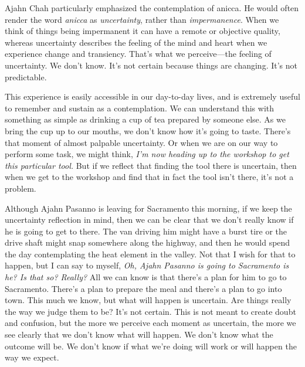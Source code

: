 Ajahn Chah particularly emphasized the contemplation of anicca. He 
would often render the word \emph{anicca} as \emph{uncertainty}, rather 
than \emph{impermanence}. When we think of things being impermanent it 
can have a remote or objective quality, whereas uncertainty describes 
the feeling of the mind and heart when we experience change and 
transiency. That's what we perceive---the feeling of uncertainty. We 
don't know. It's not certain because things are changing. It's not 
predictable.

This experience is easily accessible in our day-to-day lives, and is 
extremely useful to remember and sustain as a contemplation. We can 
understand this with something as simple as drinking a cup of tea 
prepared by someone else. As we bring the cup up to our mouths, we 
don't know how it's going to taste. There's that moment of almost 
palpable uncertainty. Or when we are on our way to perform some task, 
we might think, \emph{I'm now heading up to the workshop to get this 
particular tool.} But if we reflect that finding the tool there is 
uncertain, then when we get to the workshop and find that in fact the 
tool isn't there, it's not a problem.

Although Ajahn Pasanno is leaving for Sacramento this morning, if we 
keep the uncertainty reflection in mind, then we can be clear that we 
don't really know if he is going to get to there. The van driving him 
might have a burst tire or the drive shaft might snap somewhere along 
the highway, and then he would spend the day contemplating the heat 
element in the valley. Not that I wish for that to happen, but I can 
say to myself, \emph{Oh, Ajahn Pasanno is going to Sacramento is he? Is 
that so? Really?} All we can know is that there's a plan for him to go 
to Sacramento. There's a plan to prepare the meal and there's a plan to 
go into town. This much we know, but what will happen is uncertain. Are 
things really the way we judge them to be? It's not certain. This is 
not meant to create doubt and confusion, but the more we perceive each 
moment as uncertain, the more we see clearly that we don't know what 
will happen. We don't know what the outcome will be. We don't know if 
what we're doing will work or will happen the way we expect.

